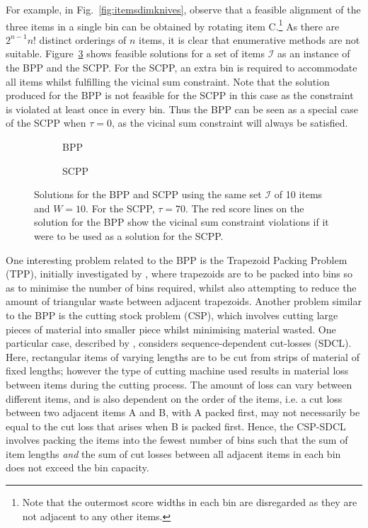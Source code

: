 \documentclass[authoryear]{elsarticle}
\begin{document}
\noindent For example, in Fig.~\ref{fig:itemsdimknives}, observe that a feasible alignment of the three items in a single bin can be obtained by rotating item C.\footnote{Note that the outermost score widths in each bin are disregarded as they are not adjacent to any other items.} As there are $2^{n-1} n!$ distinct orderings of $n$ items, it is clear that enumerative methods are not suitable. Figure~\ref{fig:bppvscpp} shows feasible solutions for a set of items $\mathcal{I}$ as an instance of the BPP and the SCPP. For the SCPP, an extra bin is required to accommodate all items whilst fulfilling the vicinal sum constraint. Note that the solution produced for the BPP is not feasible for the SCPP in this case as the constraint is violated at least once in every bin. Thus the BPP can be seen as a special case of the SCPP when $\tau=0$, as the vicinal sum constraint will always be satisfied.

\begin{figure}[H]
	\centering	
	\begin{subfigure}[h]{0.35\textwidth}
		
		\caption{BPP}
		\label{fig:bpp}
	\end{subfigure} \hspace{15mm}
	\begin{subfigure}[h]{0.35\textwidth}
		
		\caption{SCPP}
		\label{fig:scpp}
	\end{subfigure}
	\caption{Solutions for the BPP and SCPP using the same set $\mathcal{I}$ of 10 items and $W = 10$. For the SCPP, $\tau = 70$. The red score lines on the solution for the BPP show the vicinal sum constraint violations if it were to be used as a solution for the SCPP.}	
	\label{fig:bppvscpp}
\end{figure}

\noindent One interesting problem related to the BPP is the Trapezoid Packing Problem (TPP), initially investigated by \citet{lewis2011}, where trapezoids are to be packed into bins so as to minimise the number of bins required, whilst also attempting to reduce the amount of triangular waste between adjacent trapezoids. Another problem similar to the BPP is the cutting stock problem (CSP), which involves cutting large pieces of material into smaller piece whilst minimising material wasted. One particular case, described by \citet{garraffa2016}, considers sequence-dependent cut-losses (SDCL). Here, rectangular items of varying lengths are to be cut from strips of material of fixed lengths; however the type of cutting machine used results in material loss between items during the cutting process. The amount of loss can vary between different items, and is also dependent on the order of the items, i.e. a cut loss between two adjacent items A and B, with A packed first, may not necessarily be equal to the cut loss that arises when B is packed first. Hence, the CSP-SDCL involves packing the items into the fewest number of bins such that the sum of item lengths \emph{and} the sum of cut losses between all adjacent items in each bin does not exceed the bin capacity.
\end{document}
